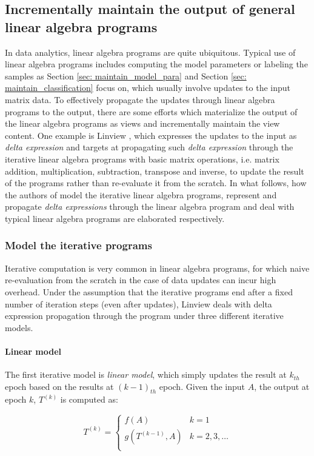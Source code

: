 \subsection{Incrementally maintain the output of general linear algebra programs}
In data analytics, linear algebra programs are quite ubiquitous. Typical use of linear algebra programs includes computing the model parameters or labeling the samples as Section \ref{sec: maintain_model_para} and Section \ref{sec: maintain_classification} focus on, which usually involve updates to the input matrix data. To effectively propagate the updates through linear algebra programs to the output, there are some efforts which materialize the output of the linear algebra programs as views and incrementally maintain the view content. One example is Linview \cite{nikolic2014linview}, which expresses the updates to the input as {\em delta expression} and targets at propagating such {\em delta expression} through the iterative linear algebra programs with basic matrix operations, i.e. matrix addition, multiplication, subtraction, transpose and inverse, to update the result of the programs rather than re-evaluate it from the scratch. In what follows, how the authors of \cite{nikolic2014linview} model the iterative linear algebra programs, represent and propagate {\em delta expressions} through the linear algebra program and deal with typical linear algebra programs are elaborated respectively.

\subsubsection{Model the iterative programs}\label{sec: iterative_model}
Iterative computation is very common in linear algebra programs, for which naive re-evaluation from the scratch in the case of data updates can incur high overhead. Under the assumption that the iterative programs end after a fixed number of iteration steps (even after updates), Linview deals with delta expression propagation through the program under three different iterative models.

\paragraph{Linear model} The first iterative model is {\em linear model}, which simply updates the result at $k_{th}$ epoch based on the results at $(k-1)_{th}$ epoch. Given the input $A$, the output at epoch $k$, $T^{(k)}$ is computed as:

\[T^{(k)}=
\begin{cases}
f(A)& k=1\\
g(T^{(k-1)}, A) & k=2,3,\dots\\
\end{cases}
\]

